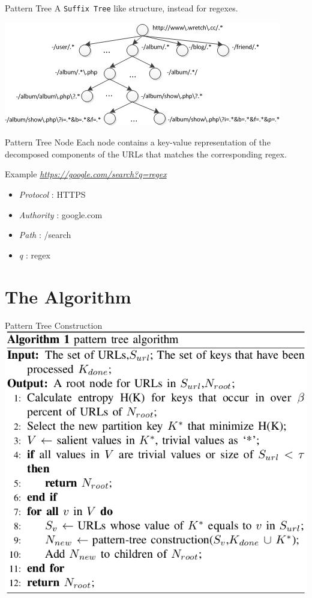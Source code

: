 \documentclass[presentation]{beamer}
\begin{document}
\begin{frame}[fragile,label={sec:orgheadline10}]{Pattern Tree}
 A \alert{\texttt{Suffix Tree}} like structure, instead for regexes.

\includegraphics[width=.9\linewidth]{./website_structure_mining-pattern_tree.jpg}
\end{frame}

\begin{frame}[label={sec:orgheadline11}]{Pattern Tree Node}
Each node contains a key-value representation of the decomposed components of the URLs that matches the corresponding regex.

\alert{Example}
\emph{\url{https://google.com/search?q=regex}}
\begin{itemize}
\item \emph{Protocol} : HTTPS
\item \emph{Authority} : google.com
\item \emph{Path} : /search
\item \emph{q} : regex
\end{itemize}
\end{frame}

\section{The Algorithm}
\label{sec:orgheadline20}

\begin{frame}[label={sec:orgheadline13}]{Pattern Tree Construction}
\includegraphics[width=.9\linewidth]{./pattern_algo1.png}
\end{frame}
\end{document}
